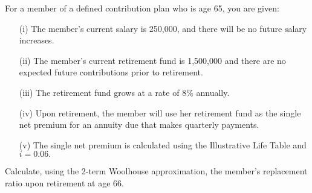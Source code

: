 For a member of a defined contribution plan who is age 65, you are given:
\begin{itemize}
\item[(i)] The member's current salary is 250,000, and there will be no future salary
increases.
\item[(ii)] The member's current retirement fund is 1,500,000 and there are no
expected future contributions prior to retirement.
\item[(iii)] The retirement fund grows at a rate of 8\% annually.
\item[(iv)] Upon retirement, the member will use her retirement fund as the single net
premium for an annuity due that makes quarterly payments.
\item[(v)] The single net premium is calculated using the Illustrative Life Table and
$i=0.06.$
\end{itemize}
Calculate, using the 2-term Woolhouse approximation, the member's replacement ratio upon retirement at age 66.




